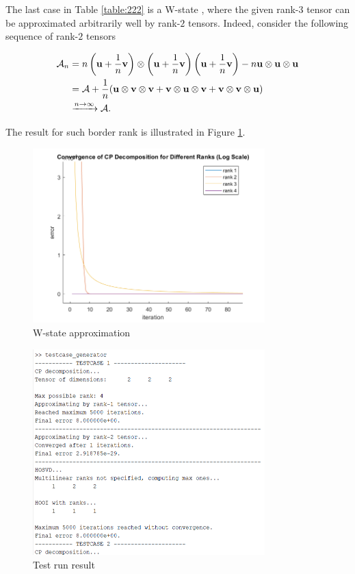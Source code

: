 The last case in Table \ref{table:222} is a W-state \cite{cabello2002bell}, where the given rank-$3$ tensor can be approximated arbitrarily well by rank-$2$ tensors. Indeed, consider the following sequence of rank-$2$ tensors

\begin{align*}
    \mathcal{A}_n
     & = n\left(\mathbf{u} + \dfrac{1}{n}\mathbf{v}\right)\otimes\left(\mathbf{u} + \dfrac{1}{n}\mathbf{v}\right)\left(\mathbf{u} + \dfrac{1}{n}\mathbf{v}\right) - n \mathbf{u}\otimes\mathbf{u}\otimes\mathbf{u} \\
     & = \mathcal{A} + \dfrac{1}{n}(\mathbf{u}\otimes \mathbf{v}\otimes \mathbf{v} + \mathbf{v}\otimes \mathbf{u}\otimes \mathbf{v} + \mathbf{v}\otimes \mathbf{v}\otimes \mathbf{u})                                       \\
     & \xrightarrow{n\to\infty} \mathcal{A}.
\end{align*}

The result for such border rank is illustrated in Figure \ref{fig:wstate}.

\begin{figure}[ht]
    \centering
    \includegraphics[width=0.8\textwidth]{img/wstate.png}
    \caption{W-state approximation}
    \label{fig:wstate}
\end{figure}



\begin{figure}
    \centering
    \includegraphics[width=0.8\textwidth]{img/testcases.png}
    \caption{Test run result}
    \label{fig:test}
\end{figure}
